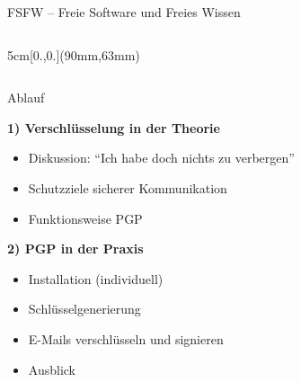 \documentclass{beamer}
\begin{document}
\begin{frame}[label=ct1]{FSFW – Freie Software und Freies Wissen}
\begin{columns}
\begin{textblock*}{5cm}[0.,0.](90mm,63mm)
\end{textblock*}  

~
\end{columns}

\end{frame}


\begin{frame}[label=ol1]{Ablauf}

  \textbf{1) Verschlüsselung in der Theorie}
  \begin{itemize}
   \item Diskussion: "`Ich habe doch nichts zu verbergen"'
   \item Schutzziele sicherer Kommunikation
   \item Funktionsweise PGP
  \end{itemize}

  \pause

  \textbf{2) PGP in der Praxis}
  \begin{itemize}
   \item Installation (individuell)
   \item Schlüsselgenerierung
   \item E-Mails verschlüsseln und signieren
   \item Ausblick
  \end{itemize}

\end{frame}

\end{document}
